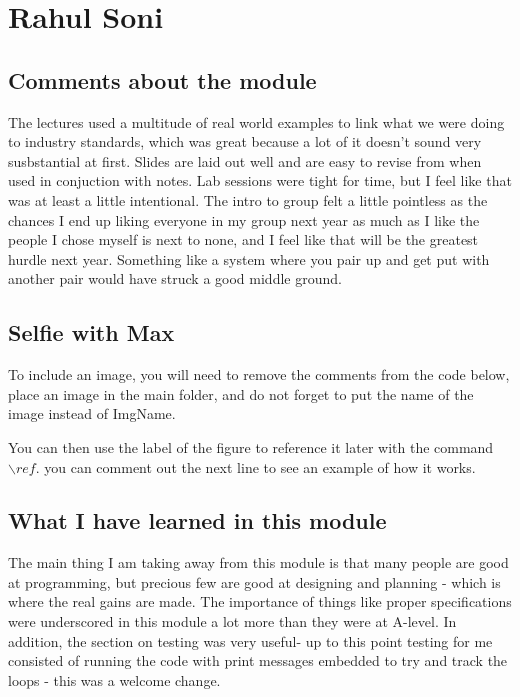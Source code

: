 \section{Rahul Soni}

\subsection{Comments about the module}
The lectures used a multitude of real world examples to link what we were doing to industry standards, which was great because a lot of it doesn't sound very susbstantial at first. Slides are laid out well and are easy to revise from when used in conjuction with notes. Lab sessions were tight for time, but I feel like that was at least a little intentional. The intro to group felt a little pointless as the chances I end up liking everyone in my group next year as much as I like the people I chose myself is next to none, and I feel like that will be the greatest hurdle next year. Something like a system where you pair up and get put with another pair would have struck a good middle ground. 

\subsection{Selfie with Max}

To include an image, you will need to remove the comments from the code below, place an image in the main folder, and do not forget to put the name of the image instead of ImgName. 


You can then use the label of the figure to reference it later with the command ${\backslash}ref.$ you can comment out the next line to see an example of how it works.


\subsection{What I have learned in this module}
The main thing I am taking away from this module is that many people are good at programming, but precious few are good at designing and planning - which is where the real gains are made. The importance of things like proper specifications were underscored in this module a lot more than they were at A-level. In addition, the section on testing was very useful- up to this point testing for me consisted of running the code with print messages embedded to try and track the loops - this was a welcome change.

